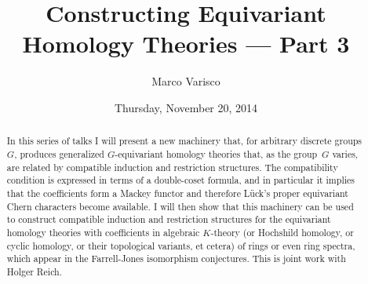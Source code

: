 \documentclass{UAmathtalk}
\author{Marco Varisco}
\title{Constructing Equivariant\\ Homology Theories --- Part 3}
\date{Thursday, November 20, 2014}
\begin{document}
\maketitle

\begin{abstract}
In this series of talks I will present a new machinery that, for arbitrary discrete groups $G$, produces generalized $G$-equivariant homology theories that, as the group~$G$ varies, are related by compatible induction and restriction structures.
The compatibility condition is expressed in terms of a double-coset formula, and in particular it implies that the coefficients form a Mackey functor and therefore L\"uck's proper equivariant Chern characters become available.
I will then show that this machinery can be used to construct compatible induction and restriction structures for the equivariant homology theories with coefficients in algebraic $K$-theory (or Hochshild homology, or cyclic homology, or their topological variants, et cetera) of rings or even ring spectra, which appear in the Farrell-Jones isomorphism conjectures.
This is joint work with Holger Reich.
\end{abstract}
\end{document}

